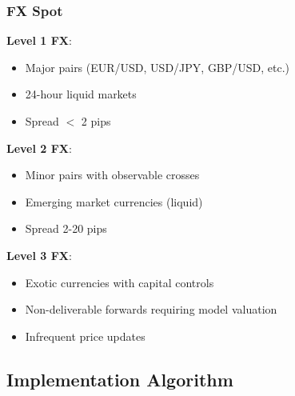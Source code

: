\documentclass[11pt,a4paper]{article}
\begin{document}
\subsubsection{FX Spot}

\textbf{Level 1 FX}:
\begin{itemize}
    \item Major pairs (EUR/USD, USD/JPY, GBP/USD, etc.)
    \item 24-hour liquid markets
    \item Spread $<$ 2 pips
\end{itemize}

\textbf{Level 2 FX}:
\begin{itemize}
    \item Minor pairs with observable crosses
    \item Emerging market currencies (liquid)
    \item Spread 2-20 pips
\end{itemize}

\textbf{Level 3 FX}:
\begin{itemize}
    \item Exotic currencies with capital controls
    \item Non-deliverable forwards requiring model valuation
    \item Infrequent price updates
\end{itemize}

\subsection{Implementation Algorithm}
\end{document}
